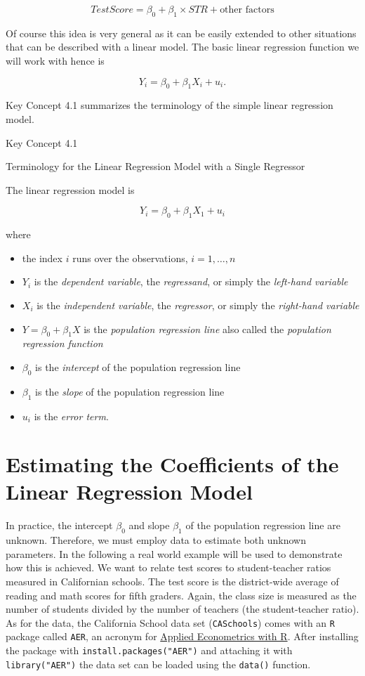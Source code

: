 \documentclass[]{book}
\providecommand{\tightlist}{%
  \setlength{\itemsep}{0pt}\setlength{\parskip}{0pt}}
\theoremstyle{definition}
\theoremstyle{definition}
\theoremstyle{definition}
\theoremstyle{remark}
\begin{document}
\[ TestScore = \beta_0 + \beta_1 \times STR + \text{other factors} \]

Of course this idea is very general as it can be easily extended to
other situations that can be described with a linear model. The basic
linear regression function we will work with hence is

\[ Y_i = \beta_0 + \beta_1 X_i + u_i. \]

Key Concept 4.1 summarizes the terminology of the simple linear
regression model.

Key Concept 4.1

Terminology for the Linear Regression Model with a Single Regressor

The linear regression model is

\[Y_i = \beta_0 + \beta_1 X_1 + u_i \]

where

\begin{itemize}
\tightlist
\item
  the index \(i\) runs over the observations, \(i=1,\dots,n\)
\item
  \(Y_i\) is the \emph{dependent variable}, the \emph{regressand}, or
  simply the \emph{left-hand variable}
\item
  \(X_i\) is the \emph{independent variable}, the \emph{regressor}, or
  simply the \emph{right-hand variable}
\item
  \(Y = \beta_0 + \beta_1 X\) is the \emph{population regression line}
  also called the \emph{population regression function}
\item
  \(\beta_0\) is the \emph{intercept} of the population regression line
\item
  \(\beta_1\) is the \emph{slope} of the population regression line
\item
  \(u_i\) is the \emph{error term}.
\end{itemize}

\section{Estimating the Coefficients of the Linear Regression
Model}\label{estimating-the-coefficients-of-the-linear-regression-model}

In practice, the intercept \(\beta_0\) and slope \(\beta_1\) of the
population regression line are unknown. Therefore, we must employ data
to estimate both unknown parameters. In the following a real world
example will be used to demonstrate how this is achieved. We want to
relate test scores to student-teacher ratios measured in Californian
schools. The test score is the district-wide average of reading and math
scores for fifth graders. Again, the class size is measured as the
number of students divided by the number of teachers (the
student-teacher ratio). As for the data, the California School data set
(\texttt{CASchools}) comes with an \texttt{R} package called
\texttt{AER}, an acronym for
\href{https://cran.r-project.org/web/packages/AER/AER.pdf}{Applied
Econometrics with R}. After installing the package with
\texttt{install.packages("AER")} and attaching it with
\texttt{library("AER")} the data set can be loaded using the
\texttt{data()} function.
\end{document}
